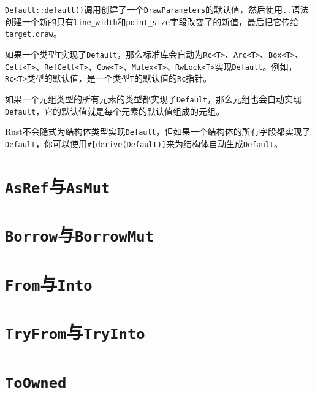 \texttt{Default::default()}调用创建了一个\texttt{DrawParameters}的默认值，然后使用\texttt{..}语法创建一个新的只有\texttt{line\_width}和\texttt{point\_size}字段改变了的新值，最后把它传给\texttt{target.draw}。

如果一个类型\texttt{T}实现了\texttt{Default}，那么标准库会自动为\texttt{Rc<T>}、\texttt{Arc<T>}、\texttt{Box<T>}、\texttt{Cell<T>}、\texttt{RefCell<T>}、\texttt{Cow<T>}、\texttt{Mutex<T>}、\texttt{RwLock<T>}实现\texttt{Default}。例如，\texttt{Rc<T>}类型的默认值，是一个类型\texttt{T}的默认值的\texttt{Rc}指针。

如果一个元组类型的所有元素的类型都实现了\texttt{Default}，那么元组也会自动实现\texttt{Default}，它的默认值就是每个元素的默认值组成的元组。

Rust不会隐式为结构体类型实现\texttt{Default}，但如果一个结构体的所有字段都实现了\texttt{Default}，你可以使用\texttt{\#[derive(Default)]}来为结构体自动生成\texttt{Default}。

\section{\texttt{AsRef}与\texttt{AsMut}}\label{asref}

\section{\texttt{Borrow}与\texttt{BorrowMut}}\label{borrow}

\section{\texttt{From}与\texttt{Into}}\label{from}

\section{\texttt{TryFrom}与\texttt{TryInto}}\label{tryfrom}

\section{\texttt{ToOwned}}\label{toowned}
